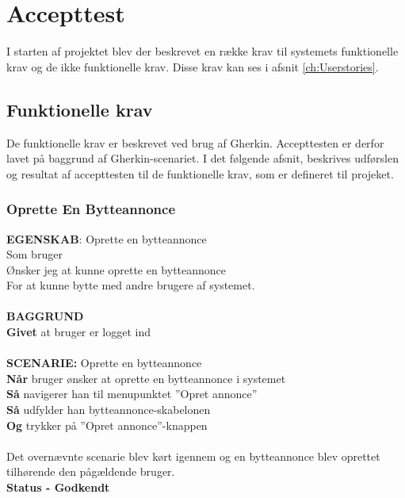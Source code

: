 \chapter{Accepttest}\label{ch:Accepttest}
I starten af projektet blev der beskrevet en række krav til systemets funktionelle krav og de ikke funktionelle krav. Disse krav kan ses i afsnit \ref{ch:Userstories}.

\section{Funktionelle krav}
De funktionelle krav er beskrevet ved brug af Gherkin. Accepttesten er derfor lavet på baggrund af Gherkin-scenariet. I det følgende afsnit, beskrives udførslen og resultat af accepttesten til de funktionelle krav, som er defineret til projeket.

\subsection{Oprette En Bytteannonce}
{\color{blue}\textbf{EGENSKAB}:} Oprette en bytteannonce \\
Som bruger \\
Ønsker jeg at kunne oprette en bytteannonce \\
For at kunne bytte med andre brugere af systemet.\\ \\
{\color{blue}\textbf{BAGGRUND}} \\
{\color{blue}\textbf{Givet}} at bruger er logget ind \\ \\
{\color{blue}\textbf{SCENARIE:}} Oprette en bytteannonce \\
{\color{blue}\textbf{Når}}  bruger ønsker at oprette en bytteannonce i systemet \\
{\color{blue}\textbf{Så}} navigerer han til menupunktet ”Opret annonce” \\
{\color{blue}\textbf{Så}} udfylder han bytteannonce-skabelonen \\
{\color{blue}\textbf{Og}} trykker på ”Opret annonce”-knappen \\ \\
Det overnævnte scenarie blev kørt igennem og en bytteannonce blev oprettet tilhørende den pågældende bruger. \\
\textbf{Status - Godkendt}

